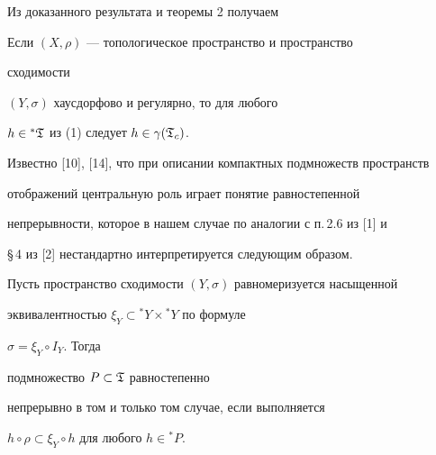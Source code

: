 Из доказанного результата и теоремы 2 получаем





\begin{cor}


Если $(X,\rho)$ --- топологическое пространство и пространство


сходимости


$(Y,\sigma)$ хаусдорфово и регулярно, то для любого


$h\in{}^*\frak T$ из (1) следует $h\in\gamma(\frak T_c)$.


\end{cor}





Известно [10], [14], что при описании компактных подмножеств пространств


отображений центральную роль играет понятие равностепенной


непрерывности, которое в нашем случае по аналогии с п.\,2.6 из [1] и


\S\,4 из [2] нестандартно интерпретируется следующим образом.





\begin{thm}


Пусть пространство сходимости $(Y,\sigma)$ равномеризуется насыщенной


эквивалентностью $\xi_Y\subset{}^*Y\times{}^*Y$ по формуле


$\sigma=\xi_Y\circ I_Y$. Тогда


подмножество $P\subset\frak T$ равностепенно


непрерывно в том и только том случае, если выполняется


$h\circ \rho\subset\xi_Y\circ h$ для любого $h\in{}^*P$.


\end{thm}





